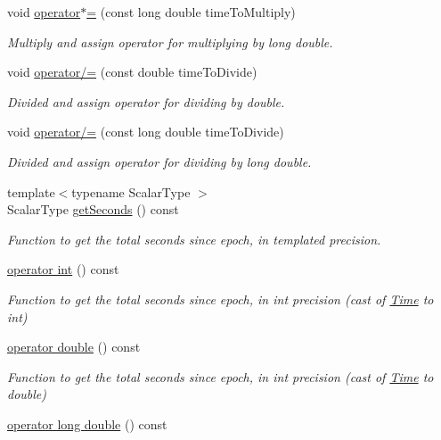 \begin{DoxyCompactItemize}
void \hyperlink{classtudat_1_1Time_a1e7bc3cdaa8761e556379282a76b7e68}{operator$\ast$=} (const long double time\+To\+Multiply)
\begin{DoxyCompactList}\small\item\em Multiply and assign operator for multiplying by long double. \end{DoxyCompactList}\item 
void \hyperlink{classtudat_1_1Time_a6247f2fadac51a1fe77d0c889b5e7c76}{operator/=} (const double time\+To\+Divide)
\begin{DoxyCompactList}\small\item\em Divided and assign operator for dividing by double. \end{DoxyCompactList}\item 
void \hyperlink{classtudat_1_1Time_a323a8df2194a69e1a29a3992490c9b6f}{operator/=} (const long double time\+To\+Divide)
\begin{DoxyCompactList}\small\item\em Divided and assign operator for dividing by long double. \end{DoxyCompactList}\item 
{\footnotesize template$<$typename Scalar\+Type $>$ }\\Scalar\+Type \hyperlink{classtudat_1_1Time_ae1531febd83d04a91238f41138d777e6}{get\+Seconds} () const 
\begin{DoxyCompactList}\small\item\em Function to get the total seconds since epoch, in templated precision. \end{DoxyCompactList}\item 
\hyperlink{classtudat_1_1Time_ad4999ea421d10cf6a7763e5960645561}{operator int} () const 
\begin{DoxyCompactList}\small\item\em Function to get the total seconds since epoch, in int precision (cast of \hyperlink{classtudat_1_1Time}{Time} to int) \end{DoxyCompactList}\item 
\hyperlink{classtudat_1_1Time_ab2a14ef735d6f656184860526bb5188e}{operator double} () const 
\begin{DoxyCompactList}\small\item\em Function to get the total seconds since epoch, in int precision (cast of \hyperlink{classtudat_1_1Time}{Time} to double) \end{DoxyCompactList}\item 
\hyperlink{classtudat_1_1Time_a0c3a98c08b377d3cca0b68566889620d}{operator long double} () const 

\end{DoxyCompactItemize}
